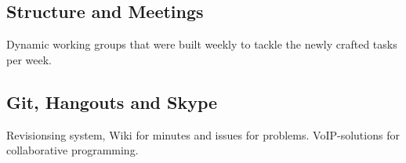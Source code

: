 \subsection{Structure and Meetings}
Dynamic working groups that were built weekly to tackle the newly crafted tasks per week.
\subsection{Git, Hangouts and Skype}
Revisionsing system, Wiki for minutes and issues for problems. VoIP-solutions for collaborative programming.
